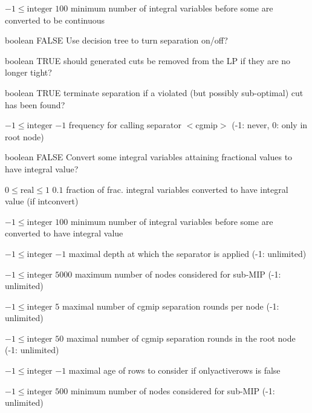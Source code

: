 %
{$-1\leq\textrm{integer}$}%
{$100$}%
{minimum number of integral variables before some are converted to be continuous}%
{}

%
{boolean}%
{FALSE}%
{Use decision tree to turn separation on/off?}%
{}

%
{boolean}%
{TRUE}%
{should generated cuts be removed from the LP if they are no longer tight?}%
{}

%
{boolean}%
{TRUE}%
{terminate separation if a violated (but possibly sub-optimal) cut has been found?}%
{}

%
{$-1\leq\textrm{integer}$}%
{$-1$}%
{frequency for calling separator $<$cgmip$>$ (-1: never, 0: only in root node)}%
{}

%
{boolean}%
{FALSE}%
{Convert some integral variables attaining fractional values to have integral value?}%
{}

%
{$0\leq\textrm{real}\leq1$}%
{$0.1$}%
{fraction of frac. integral variables converted to have integral value (if intconvert)}%
{}

%
{$-1\leq\textrm{integer}$}%
{$100$}%
{minimum number of integral variables before some are converted to have integral value}%
{}

%
{$-1\leq\textrm{integer}$}%
{$-1$}%
{maximal depth at which the separator is applied (-1: unlimited)}%
{}

%
{$-1\leq\textrm{integer}$}%
{$5000$}%
{maximum number of nodes considered for sub-MIP (-1: unlimited)}%
{}

%
{$-1\leq\textrm{integer}$}%
{$5$}%
{maximal number of cgmip separation rounds per node (-1: unlimited)}%
{}

%
{$-1\leq\textrm{integer}$}%
{$50$}%
{maximal number of cgmip separation rounds in the root node (-1: unlimited)}%
{}

%
{$-1\leq\textrm{integer}$}%
{$-1$}%
{maximal age of rows to consider if onlyactiverows is false}%
{}

%
{$-1\leq\textrm{integer}$}%
{$500$}%
{minimum number of nodes considered for sub-MIP (-1: unlimited)}%
{}

